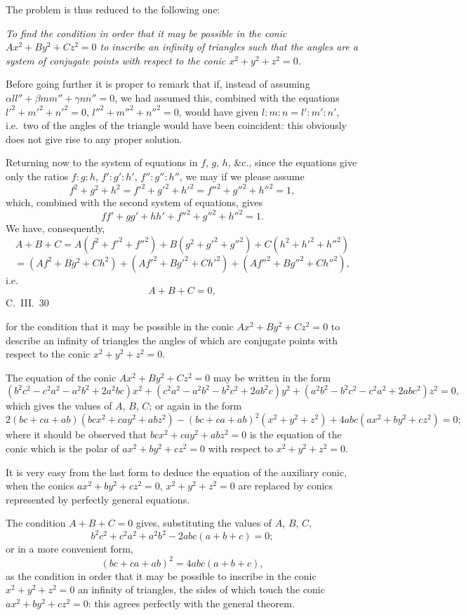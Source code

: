 \documentclass[11pt,a4paper]{book}
\begin{document}
{{The problem is thus reduced to the following one:

\textit{To find the condition in order that it may be possible in the conic $Ax^2 + By^2 + Cz^2 = 0$ to inscribe an infinity of triangles such that the angles are a system of conjugate points with respect to the conic $x^2 + y^2 + z^2 = 0$.}

Before going further it is proper to remark that if, instead of assuming $\alpha ll'' + \beta mm'' + \gamma nn'' = 0$, we had assumed this, combined with the equations $l'^2 + m'^2 + n'^2 = 0$, $l''^2 + m''^2 + n''^2 = 0$, would have given $l:m:n = l':m':n'$, i.e.\ two of the angles of the triangle would have been coincident: this obviously does not give rise to any proper solution.

Returning now to the system of equations in $f$, $g$, $h$, \&c., since the equations give only the ratios $f:g:h$, $f':g':h'$, $f'':g'':h''$, we may if we please assume
\[
f^2 + g^2 + h^2 = f'^2 + g'^2 + h'^2 = f''^2 + g''^2 + h''^2 = 1,
\]
which, combined with the second system of equations, gives
\[
ff' + gg' + hh' + f''^2 + g''^2 + h''^2 = 1.
\]
We have, consequently,
\[
A + B + C = A(f^2 + f'^2 + f''^2) + B(g^2 + g'^2 + g''^2) + C(h^2 + h'^2 + h''^2)
\]
\[
= (Af^2 + Bg^2 + Ch^2) + (Af'^2 + Bg'^2 + Ch'^2) + (Af''^2 + Bg''^2 + Ch''^2),
\]
i.e.
\[
A + B + C = 0,
\]
\hfill C.~III.~30
\newpage

for the condition that it may be possible in the conic $Ax^2 + By^2 + Cz^2 = 0$ to describe an infinity of triangles the angles of which are conjugate points with respect to the conic $x^2 + y^2 + z^2 = 0$.

The equation of the conic $Ax^2 + By^2 + Cz^2 = 0$ may be written in the form
\[
(b^2c^2 - c^2a^2 - a^2b^2 + 2a^2bc)x^2 + (c^2a^2 - a^2b^2 - b^2c^2 + 2ab^2c)y^2 + (a^2b^2 - b^2c^2 - c^2a^2 + 2abc^2)z^2 = 0,
\]
which gives the values of $A$, $B$, $C$; or again in the form
\[
2(bc + ca + ab)(bcx^2 + cay^2 + abz^2) - (bc + ca + ab)^2(x^2 + y^2 + z^2) + 4abc(ax^2 + by^2 + cz^2) = 0;
\]
where it should be observed that $bcx^2 + cay^2 + abz^2 = 0$ is the equation of the conic which is the polar of $ax^2 + by^2 + cz^2 = 0$ with respect to $x^2 + y^2 + z^2 = 0$.

It is very easy from the last form to deduce the equation of the auxiliary conic, when the conics $ax^2 + by^2 + cz^2 = 0$, $x^2 + y^2 + z^2 = 0$ are replaced by conics represented by perfectly general equations.

The condition $A + B + C = 0$ gives, substituting the values of $A$, $B$, $C$,
\[
b^2c^2 + c^2a^2 + a^2b^2 - 2abc(a+b+c) = 0;
\]
or in a more convenient form,
\[
(bc + ca + ab)^2 = 4abc(a + b + c),
\]
as the condition in order that it may be possible to inscribe in the conic $x^2 + y^2 + z^2 = 0$ an infinity of triangles, the sides of which touch the conic $ax^2 + by^2 + cz^2 = 0$: this agrees perfectly with the general theorem.

}}
\end{document}
